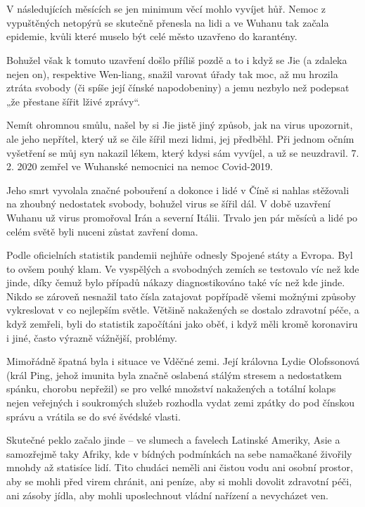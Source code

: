 \chapter{}

V následujících měsících se jen minimum věcí mohlo vyvíjet hůř. Nemoc z vypuštěných netopýrů se skutečně přenesla na lidi a ve Wuhanu tak začala epidemie, kvůli které muselo být celé město uzavřeno do karantény.

Bohužel však k tomuto uzavření došlo příliš pozdě a to i když se Jie (a zdaleka nejen on), respektive Wen-liang, snažil varovat úřady tak moc, až mu hrozila ztráta svobody (či spíše její čínské napodobeniny) a jemu nezbylo než podepsat „že přestane šířit lživé zprávy“.

Nemít ohromnou smůlu, našel by si Jie jistě jiný způsob, jak na virus upozornit, ale jeho nepřítel, který už se čile šířil mezi lidmi, jej předběhl. Při jednom očním vyšetření se můj syn nakazil lékem, který kdysi sám vyvíjel, a už se neuzdravil. 7. 2. 2020 zemřel ve Wuhanské nemocnici na nemoc Covid-2019.

Jeho smrt vyvolala značné pobouření a dokonce i lidé v Číně si nahlas stěžovali na zhoubný nedostatek svobody, bohužel virus se šířil dál. V době uzavření Wuhanu už virus promořoval Irán a severní Itálii. Trvalo jen pár měsíců a lidé po celém světě byli nuceni zůstat zavření doma.

Podle oficielních statistik pandemii nejhůře odnesly Spojené státy a Evropa. Byl to ovšem pouhý klam. Ve vyspělých a svobodných zemích se testovalo víc než kde jinde, díky čemuž bylo případů nákazy diagnostikováno také víc než kde jinde. Nikdo se zároveň nesnažil tato čísla zatajovat popřípadě všemi možnými způsoby vykreslovat v co nejlepším světle. Většině nakažených se dostalo zdravotní péče, a když zemřeli, byli do statistik započítáni jako oběť, i když měli kromě koronaviru i jiné, často výrazně vážnější, problémy. 

Mimořádně špatná byla i situace ve Vděčné zemi. Její královna Lydie Olofssonová (král Ping, jehož imunita byla značně oslabená stálým stresem a nedostatkem spánku, chorobu nepřežil) se pro velké množství nakažených a totální kolaps nejen veřejných i soukromých služeb rozhodla vydat zemi zpátky do pod čínskou správu a vrátila se do své švédské vlasti. 

Skutečné peklo začalo jinde – ve slumech a favelech Latinské Ameriky, Asie a samozřejmě taky Afriky, kde v bídných podmínkách na sebe namačkané živořily mnohdy až statisíce lidí. Tito chudáci neměli ani čistou vodu ani osobní prostor, aby se mohli před virem chránit, ani peníze, aby si mohli dovolit zdravotní péči, ani zásoby jídla, aby mohli uposlechnout vládní nařízení a nevycházet ven.


